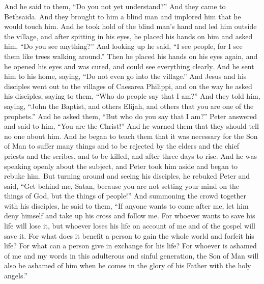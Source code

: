 \begin{biblechapter}
\verse And he said to them, “Do you not yet understand?”
 And they came to Bethsaida. And they brought to him a blind man and implored him that he would touch him.
\verse And he took hold of the blind man’s hand and led him outside the village, and after spitting in his eyes, he placed his hands on him and asked him, “Do you see anything?”
\verse And looking up he said, “I see people, for I see them like trees walking around.”
\verse Then he placed his hands on his eyes again, and he opened his eyes and was cured, and could see everything clearly.
\verse And he sent him to his home, saying, “Do not even go into the village.”
 And Jesus and his disciples went out to the villages of Caesarea Philippi, and on the way he asked his disciples, saying to them, “Who do people say that I am?”
\verse And they told him, saying, “John the Baptist, and others Elijah, and others that you are one of the prophets.”
\verse And he asked them, “But who do you say that I am?” Peter answered and said to him, “You are the Christ!”
\verse And he warned them that they should tell no one about him.
 And he began to teach them that it was necessary for the Son of Man to suffer many things and to be rejected by the elders and the chief priests and the scribes, and to be killed, and after three days to rise.
\verse And he was speaking openly about the subject, and Peter took him aside and began to rebuke him.
\verse But turning around and seeing his disciples, he rebuked Peter and said, “Get behind me, Satan, because you are not setting your mind on the things of God, but the things of people!”
 And summoning the crowd together with his disciples, he said to them, “If anyone wants to come after me, let him deny himself and take up his cross and follow me.
\verse For whoever wants to save his life will lose it, but whoever loses his life on account of me and of the gospel will save it.
\verse For what does it benefit a person to gain the whole world and forfeit his life?
\verse For what can a person give in exchange for his life?
\verse For whoever is ashamed of me and my words in this adulterous and sinful generation, the Son of Man will also be ashamed of him when he comes in the glory of his Father with the holy angels.”
\end{biblechapter}

